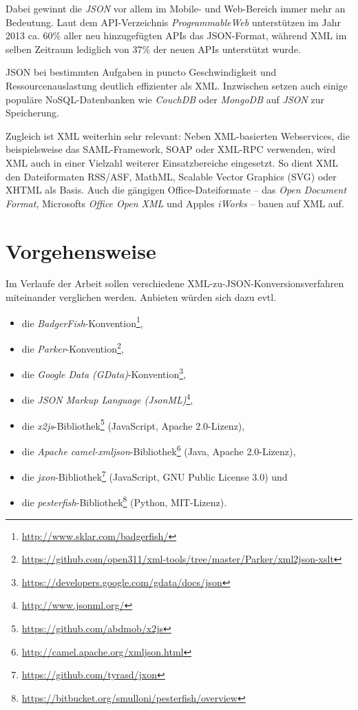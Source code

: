 \documentclass[conference]{template/IEEEtran}
\begin{document}
Dabei gewinnt die \emph{JSON} vor allem im Mobile-
und Web-Bereich immer mehr an Bedeutung. Laut dem API-Verzeichnis
\emph{ProgrammableWeb} unterstützen im Jahr 2013 ca. 60\% aller neu
hinzugefügten APIs das JSON-Format, während XML im selben Zeitraum lediglich
von 37\% der neuen APIs unterstützt wurde.\cite{duvander2013convergence}

JSON bei bestimmten Aufgaben in puncto Geschwindigkeit und Ressourcenauslastung
deutlich effizienter\cite{nurseitov2009comparison} als XML\@. Inzwischen setzen
auch einige populäre NoSQL-Datenbanken wie \emph{CouchDB} oder \emph{MongoDB}
auf \emph{JSON} zur Speicherung.

Zugleich ist XML weiterhin sehr relevant: Neben XML-basierten Webservices, die
beispielsweise das SAML-Framework, SOAP oder XML-RPC verwenden, wird XML auch
in einer Vielzahl weiterer Einsatzbereiche eingesetzt. So dient XML den
Dateiformaten RSS/ASF, MathML, Scalable Vector Graphics (SVG) oder XHTML als
Basis. Auch die gängigen Office-Dateiformate -- das \emph{Open %
Document Format}, Microsofts \emph{Office Open XML} und Apples
\emph{iWorks} -- bauen auf XML auf. %


\section{Vorgehensweise}
\label{sec:workingmethod}
Im Verlaufe der Arbeit sollen verschiedene XML-zu-JSON-Konversionsverfahren
miteinander verglichen werden. Anbieten würden sich dazu evtl.

\begin{itemize}
    \item die \emph{BadgerFish}-Konvention\footnote{\url{http://www.sklar.com/badgerfish/}},
    \item die \emph{Parker}-Konvention\footnote{\url{https://github.com/open311/xml-tools/tree/master/Parker/xml2json-xslt}},
    \item die \emph{Google Data (GData)}-Konvention\footnote{\url{https://developers.google.com/gdata/docs/json}},
    \item die \emph{JSON Markup Language (JsonML)}\footnote{\url{http://www.jsonml.org/}},
    \item die \emph{x2js}-Bibliothek\footnote{\url{https://github.com/abdmob/x2js}} (JavaScript, Apache 2.0-Lizenz),
    \item die \emph{Apache camel-xmljson}-Bibliothek\footnote{\url{http://camel.apache.org/xmljson.html}} (Java, Apache 2.0-Lizenz),
    \item die \emph{jxon}-Bibliothek\footnote{\url{https://github.com/tyrasd/jxon}} (JavaScript, GNU Public License 3.0) und
    \item die \emph{pesterfish}-Bibliothek\footnote{\url{https://bitbucket.org/smulloni/pesterfish/overview}} (Python, MIT-Lizenz).
\end{itemize}
\end{document}
